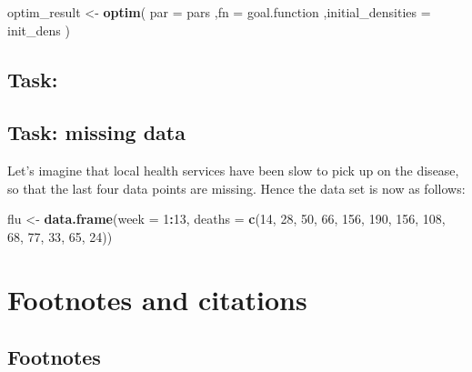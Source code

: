 \documentclass[
]{book}
\newenvironment{Shaded}{\begin{snugshade}}{\end{snugshade}}
\newcommand{\AttributeTok}[1]{\textcolor[rgb]{0.13,0.29,0.53}{#1}}
\newcommand{\DecValTok}[1]{\textcolor[rgb]{0.00,0.00,0.81}{#1}}
\newcommand{\FunctionTok}[1]{\textcolor[rgb]{0.13,0.29,0.53}{\textbf{#1}}}
\newcommand{\NormalTok}[1]{#1}
\newcommand{\OtherTok}[1]{\textcolor[rgb]{0.56,0.35,0.01}{#1}}
\newcommand{\SpecialCharTok}[1]{\textcolor[rgb]{0.81,0.36,0.00}{\textbf{#1}}}
\theoremstyle{definition}
\theoremstyle{definition}
\theoremstyle{definition}
\theoremstyle{definition}
\theoremstyle{remark}
\begin{document}
\begin{Shaded}
\begin{Highlighting}[]
\NormalTok{optim\_result }\OtherTok{\textless{}{-}} \FunctionTok{optim}\NormalTok{(}
  \AttributeTok{par =}\NormalTok{ pars}
\NormalTok{  ,}\AttributeTok{fn =}\NormalTok{ goal.function}
\NormalTok{  ,}\AttributeTok{initial\_densities =}\NormalTok{ init\_dens}
\NormalTok{)}
\end{Highlighting}
\end{Shaded}

\section{Task:}\label{task}

\section{Task: missing data}\label{task-missing-data}

Let's imagine that local health services have been slow
to pick up on the disease, so that the last four data points
are missing. Hence the data set is now as follows:

\begin{Shaded}
\begin{Highlighting}[]
\NormalTok{flu }\OtherTok{\textless{}{-}} \FunctionTok{data.frame}\NormalTok{(}\AttributeTok{week =} \DecValTok{1}\SpecialCharTok{:}\DecValTok{13}\NormalTok{,}
                  \AttributeTok{deaths =} \FunctionTok{c}\NormalTok{(}\DecValTok{14}\NormalTok{, }\DecValTok{28}\NormalTok{, }\DecValTok{50}\NormalTok{, }\DecValTok{66}\NormalTok{, }\DecValTok{156}\NormalTok{, }\DecValTok{190}\NormalTok{, }\DecValTok{156}\NormalTok{, }\DecValTok{108}\NormalTok{, }\DecValTok{68}\NormalTok{, }\DecValTok{77}\NormalTok{, }\DecValTok{33}\NormalTok{, }\DecValTok{65}\NormalTok{, }\DecValTok{24}\NormalTok{))}
\end{Highlighting}
\end{Shaded}

\chapter{Footnotes and citations}\label{footnotes-and-citations}

\section{Footnotes}\label{footnotes}
\end{document}
